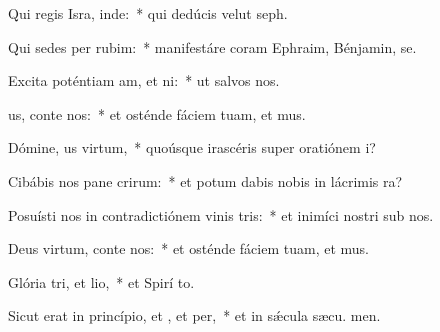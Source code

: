 \item Qui regis Isra, inde:~* qui dedúcis velut  seph.
\item Qui sedes per rubim:~* manifestáre coram Ephraim, Bénjamin,  se.
\item Excita poténtiam am, et ni:~* ut salvos  nos.
\item {}us, conte nos:~* et osténde fáciem tuam, et  mus.
\item Dómine, us virtum,~* quoúsque irascéris super oratiónem  i?
\item Cibábis nos pane crirum:~* et potum dabis nobis in lácrimis  ra?
\item Posuísti nos in contradictiónem vinis tris:~* et inimíci nostri sub nos.
\item Deus virtum, conte nos:~* et osténde fáciem tuam, et  mus.
\item Glória tri, et lio,~* et Spirí to.
\item Sicut erat in princípio, et , et per,~* et in sǽcula sæcu. men.

